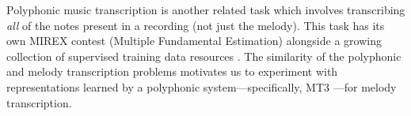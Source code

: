 Polyphonic music transcription is another related task which involves transcribing \emph{all} of the notes present in a recording (not just the melody).
This task has its own MIREX contest (Multiple Fundamental \fnot{} Estimation) alongside a growing collection of supervised training data resources \cite{benetos2013automatic,thickstun2017learning,hawthorne2019enabling,manilow2019cutting}. 
The similarity of the polyphonic and melody transcription problems motivates us to
experiment with representations learned by a polyphonic system---specifically, MT3 \cite{gardner2021mt3}---for melody transcription.